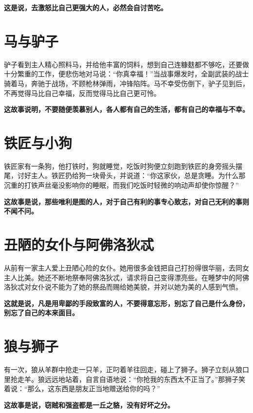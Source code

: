 {\bfseries \color{red}这是说，去激怒比自己更强大的人，必然会自讨苦吃。}

\section{马与驴子}

驴子看到主人精心照料马，并给他丰富的饲料，想到自己连糠麸都不够吃，还要做十分繁重的工作，便悲伤地对马说：“你真幸福！”当战事爆发时，全副武装的战士骑着马，奔驰于战场，不顾枪林弹雨，冲锋陷阵。马不幸受伤倒下，驴子见到后，不再觉得马比自己幸福，反而觉得马比自己更可怜。

{\bfseries \color{red}这故事说明，不要随便羡慕别人，各人都有自己的生活，都有自己的幸福与不幸。}

\section{铁匠与小狗}

铁匠家有一条狗，他打铁时，狗就睡觉，吃饭时狗便立刻跑到铁匠的身旁摇头摆尾，讨好主人。铁匠扔给狗一块骨头，并说道：“你这家伙，总是贪睡。为什么那沉重的打铁声丝毫没影响你的睡眠，而我们吃饭时轻微的响动声却使你惊醒？”

{\bfseries \color{red}这故事是说，那些唯利是图的人，对于自己有利的事专心致志，对自己无利的事则不闻不问。}

\section{丑陋的女仆与阿佛洛狄忒}

从前有一家主人爱上丑陋心险的女仆。她用很多金钱把自己打扮得很华丽，去同女主人比美。她还不断地祭奉阿佛洛狄忒，请求将自己变得漂亮些。在睡梦中的阿佛洛狄忒对女仆说不能为了她的祭品而赐给她美貌，并对以她为美的人感到气愤。

{\bfseries \color{red}这就是说，凡是用卑鄙的手段致富的人，不要得意忘形，别忘了自己是什么身份，别忘了自己的本来面目。}

\section{狼与狮子}

有一次，狼从羊群中抢走一只羊，正叼着羊往回走，碰上了狮子。狮子立刻从狼口里抢走羊。狼远远地站着，自言自语地说：“你抢我的东西太不正当了。”那狮子笑着说：“那么，这东西是朋友正当地赠送给你的吗？”

{\bfseries \color{red}这故事是说，窃贼和强盗都是一丘之貉，没有好坏之分。}


